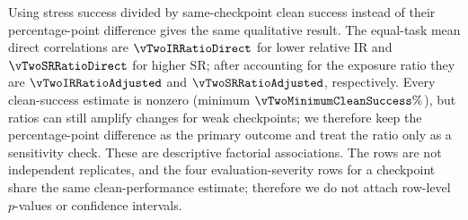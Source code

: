 
\FloatBarrier

Using stress success divided by same-checkpoint clean success instead of their
percentage-point difference gives the same qualitative result. The equal-task
mean direct correlations are $\vTwoIRRatioDirect$ for lower relative IR and
$\vTwoSRRatioDirect$ for higher SR; after accounting for the exposure ratio
they are $\vTwoIRRatioAdjusted$ and $\vTwoSRRatioAdjusted$, respectively.
Every clean-success estimate is nonzero (minimum
$\vTwoMinimumCleanSuccess\%$), but ratios can still amplify changes for weak
checkpoints; we therefore keep the percentage-point difference as the primary
outcome and treat the ratio only as a sensitivity check. These are descriptive
factorial associations. The \vTwoRowCount{} rows are not independent
replicates, and the four evaluation-severity rows for a checkpoint share the
same clean-performance estimate; therefore we do not attach row-level
$p$-values or confidence intervals.
